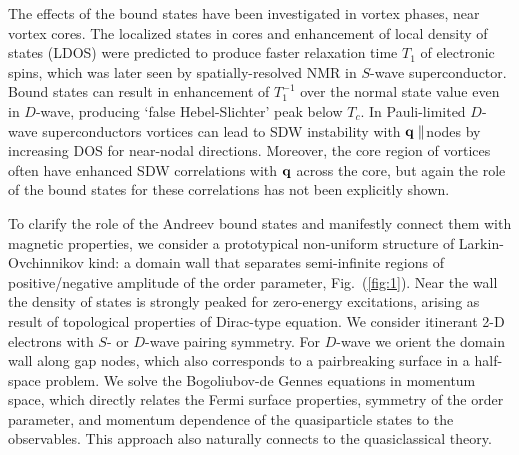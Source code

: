 \documentclass[prb,aps,showpacs,amsmath,twocolumn,10pt]{revtex4-1}
\begin{document}
%

The effects of the bound states have been investigated in vortex phases,
near vortex cores. The localized states in cores and 
enhancement of local density of states (LDOS) were
predicted\cite{Takigawa1999} to produce faster relaxation time $T_1$ of
electronic spins, which was later seen by spatially-resolved NMR in $S$-wave superconductor.\cite{Nakai2008} 
Bound states can result in enhancement of $T_1^{-1}$ over the normal state
value even in $D$-wave,\cite{Tanaka2015} producing 
`false Hebel-Slichter' peak below $T_c$. 
In Pauli-limited $D$-wave superconductors vortices can lead to SDW instability with ${\bf q}
\parallel $nodes by increasing DOS for near-nodal directions.\cite{sdw_vortex}
Moreover, the core region of vortices often have enhanced SDW 
correlations\cite{Ogata1999,JXZhu2001,Ghosal2002} with ${\bf q}$ across the
core, but again the role of the 
bound states for these correlations has not been explicitly shown. 

To clarify the role of the Andreev bound states and manifestly connect them with 
magnetic properties, we consider a prototypical non-uniform
structure of Larkin-Ovchinnikov kind: a domain wall that separates
semi-infinite regions of positive/negative amplitude of the order parameter, 
Fig.~(\ref{fig:1}).
Near the wall the density of states is
strongly peaked for zero-energy excitations, arising as result of topological
properties of Dirac-type equation.\cite{Tanaka2012,Mizushima2016} 
We consider itinerant 2-D electrons with $S$- or $D$-wave pairing symmetry. 
For $D$-wave we orient the domain wall along gap nodes,\cite{Vorontsov2005fflo} 
which also corresponds to a pairbreaking surface in a half-space problem. 
We solve the Bogoliubov-de Gennes equations in momentum space, which directly
relates the Fermi surface properties, symmetry of the order parameter, and
momentum dependence of the quasiparticle states 
to the observables. This approach also naturally connects to the quasiclassical theory. 
\end{document}
